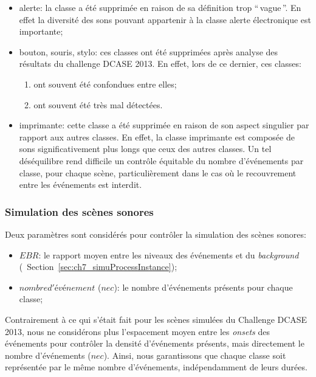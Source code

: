 \begin{itemize}
\item alerte: la classe a été supprimée en raison de sa définition trop ``\,vague\,''. En effet la diversité des sons pouvant appartenir à la classe alerte électronique est importante;

\item bouton, souris, stylo: ces classes ont été supprimées après analyse des résultats du challenge DCASE 2013. En effet, lors de ce dernier, ces classes:

\begin{enumerate}
\item ont souvent été confondues entre elles;
\item ont souvent été très mal détectées. 
\end{enumerate}

\item imprimante: cette classe a été supprimée en raison de son aspect singulier par rapport aux autres classes. En effet, la classe imprimante est composée de sons significativement plus longs que ceux des autres classes. Un tel déséquilibre rend difficile un contrôle équitable du nombre d'événements par classe, pour chaque scène, particulièrement dans le cas où le recouvrement entre les événements est interdit.

\end{itemize}

\subsubsection{Simulation des scènes sonores}
\label{sec:ch7_simulationDcase2016}

Deux paramètres sont considérés pour contrôler la simulation des scènes sonores:

\begin{itemize}
\item $EBR$: le rapport moyen entre les niveaux des événements et du \emph{background} (\cf~Section~\ref{sec:ch7_simuProcessInstance});
\item $nombre d'événement$ ($nec$): le nombre d'événements présents pour chaque classe;
\end{itemize}

Contrairement à ce qui s'était fait pour les scènes simulées du Challenge DCASE 2013, nous ne considérons plus l'espacement moyen entre les \emph{onsets} des événements pour contrôler la densité d'événements présents, mais directement le nombre d'événements ($nec$). Ainsi, nous garantissons que chaque classe soit représentée par le même nombre d'événements, indépendamment de leurs durées.

